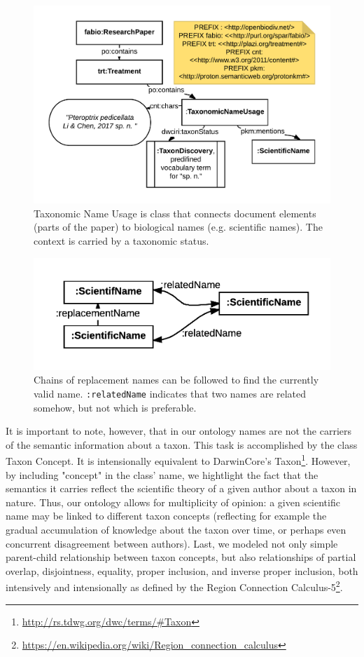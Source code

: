 \documentclass{IOS-Book-Article}
\begin{document}
\begin{figure}[h!]
\includegraphics[width=\textwidth]{Extended_Abstract_Fig__1.png}
\caption{Taxonomic Name Usage is class that connects document elements (parts of the paper) to biological names (e.g. scientific names). The context is carried by a taxonomic status.}
\label{TNU}
\end{figure}

\begin{figure}[h!]
\includegraphics[width=\textwidth]{Extended_Abstract_Fig_2.png}
\caption{Chains of replacement names can be followed to find the currently valid name. {\tt :relatedName} indicates that two names are related somehow, but not which is preferable.}
\label{name}
\end{figure}

It is important to note, however, that in our ontology names are not the carriers of the semantic information about a taxon. This task is accomplished by the class Taxon Concept. It is intensionally equivalent to DarwinCore's Taxon\footnote{\url{http://rs.tdwg.org/dwc/terms/\#Taxon}}. However, by including "concept" in the class' name, we hightlight the fact that the  semantics it carries reflect the scientific theory of a given author about a taxon in nature. Thus, our ontology allows for multiplicity of opinion: a given scientific name may be linked to different taxon concepts (reflecting for example the gradual accumulation of knowledge about the taxon over time, or perhaps even concurrent disagreement between authors). Last, we modeled not only simple parent-child relationship between taxon concepts, but also relationships of partial overlap, disjointness, equality, proper inclusion, and inverse proper inclusion, both intensively and intensionally as defined by the Region Connection Calculus-5\footnote{\url{https://en.wikipedia.org/wiki/Region\_connection\_calculus}}.
\end{document}
